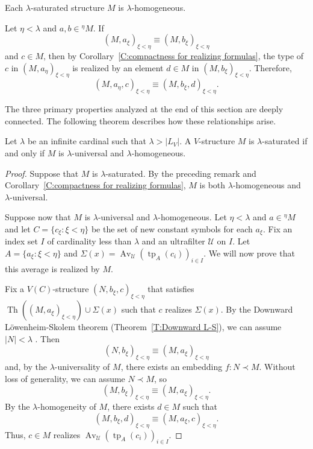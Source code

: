 \documentclass{scrartcl}
\DeclareMathOperator{\Av}{Av }
\DeclareMathOperator{\Th}{Th}
\DeclareMathOperator{\tp}{tp}
\begin{document}
\begin{remark}
Each $\lambda$-saturated structure $M$ is $\lambda$-homogeneous. 

Let $\eta<\lambda$ and $a,b\in{}^\eta M$. If
\[
(M,a_\xi)_{\xi<\eta} \equiv  (M,b_\xi)_{\xi<\eta}
\]
and $c\in M$, then by Corollary~\ref{C:compactness for realizing formulas}, the type of $c$ in $(M,a_\eta)_{\xi<\eta}$ is realized by an element $d\in M$ in $(M,b_\xi)_{\xi<\eta}$. Therefore, 
\[
(M,a_\eta,c)_{\xi<\eta} \equiv (M,b_\xi,d)_{\xi<\eta}.
\]
\end{remark}

The three primary properties analyzed at the end of this section are deeply connected. The following theorem describes how these relationships arise.

\begin{theorem}
\label{T:saturation and homogeneity}
Let $\lambda$ be an infinite cardinal such that $\lambda>|L_V|$. A $V$-structure $M$ is $\lambda$-saturated if and only if $M$ is $\lambda$-universal and $\lambda$-homogeneous.
\end{theorem}


\begin{proof}
Suppose that $M$ is $\lambda$-saturated. By the preceding remark and Corollary~\ref{C:compactness for realizing formulas},
$M$ is both $\lambda$-homogeneous and $\lambda$-universal.

Suppose now that $M$ is $\lambda$-universal and $\lambda$-homogeneous. Let $\eta<\lambda$ and $a\in{}^\eta M$ and let $C=\{ c_\xi \colon \xi<\eta \}$ be the set of new constant symbols for each $a_\xi$. 
Fix an index set $I$ of cardinality less than $\lambda$ and an ultrafilter $\mathscr{U}$ on $I$. Let 
$A=\{a_\xi \colon \xi<\eta\}$ and $\Sigma(x)=\Av_\mathscr{U}(\tp_A(c_i))_{i\in I}$. We will now prove that this average is realized by $M$. 

Fix a $V(C)$-structure $(N,b_\xi,c)_{\xi<\eta}$ that satisfies $\Th((M,a_\xi)_{\xi<\eta})\cup\Sigma(x)$ such that $c$ realizes $\Sigma(x)$. By the Downward Löwenheim-Skolem theorem (Theorem~\ref{T:Downward L-S}), we can assume $|N|<\lambda$ . Then
\[
(N,b_\xi)_{\xi<\eta} \equiv (M,a_\xi)_{\xi<\eta}
\]
and, by the $\lambda$-universality of $M$, there exists an embedding $f:N\prec M$. Without loss of generality, we can assume $N\prec M$, so
\[
(M,b_\xi)_{\xi<\eta} \equiv (M,a_\xi)_{\xi<\eta}.
\]
By the $\lambda$-homogeneity of $M$, there exists $d\in M$ such that
\[
(M,b_\xi,d)_{\xi<\eta} \equiv (M,a_\xi,c)_{\xi<\eta}.
\]
Thus, $c\in M$ realizes $\Av_\mathscr{U}(\tp_A(c_i))_{i\in I}$.
\end{proof}
\end{document}

